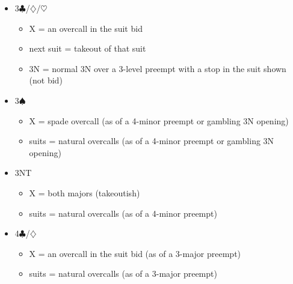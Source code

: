 \begin{itemize}
\item 3$\clubsuit$/$\diamondsuit$/$\heartsuit$
	\begin{itemize}
	\item X = an overcall in the suit bid
	\item next suit = takeout of that suit
	\item 3N = normal 3N over a 3-level preempt with a stop in the suit shown (not bid)
	\end{itemize}
\item 3$\spadesuit$
	\begin{itemize}
	\item X = spade overcall (as of a 4-minor preempt or gambling 3N opening)
	\item suits = natural overcalls (as of a 4-minor preempt or gambling 3N opening)
	\end{itemize}
\item 3NT
	\begin{itemize}
	\item X = both majors (takeoutish)
	\item suits = natural overcalls (as of a 4-minor preempt)
	\end{itemize}
\item 4$\clubsuit$/$\diamondsuit$
	\begin{itemize}
	\item X = an overcall in the suit bid (as of a 3-major preempt)
	\item suits = natural overcalls (as of a 3-major preempt)
	\end{itemize}
\end{itemize}


